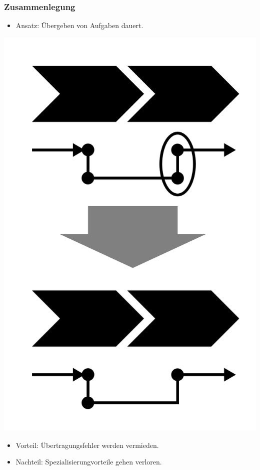 \documentclass[xcolor=dvipsnames]{beamer}
\begin{document}
 \begin{frame}
  \frametitle{Zusammenlegung}
  \begin{itemize}
    \item Ansatz: Übergeben von Aufgaben dauert.
  \end{itemize}
  \centerline{\includegraphics[scale=2.5]{4_6_3.png}}
  \begin{itemize}
    \item Vorteil: Übertragungsfehler werden vermieden.
    \item Nachteil: Spezialisierungvorteile gehen verloren.
  \end{itemize}
 \end{frame}
\end{document}
